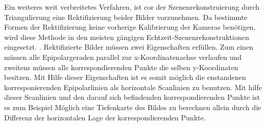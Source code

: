 %
%
%
%
%
%
%
%
Ein weiteres weit verbreitetes Verfahren, ist cor der Szenenrekonstruierung durch Triangulierung eine Rektifizierung beider Bilder vorzunehmen\cite{MatlabRec,ZZ,Javier,Fusiello}. Da bestimmte Formen der Rektifizierung keine vorherige Kalibrierung der Kameras benötigen, wird diese Methode in den meisten gängigen Echtzeit-Szenenrekonstruktionen eingesetzt. \cite{Fusiello,Javier,R.H.}.
Rektifizierte Bilder müssen zwei Eigenschaften erfüllen. Zum einen müssen alle Epipolargeraden parallel zur x-Koordinatenachse verlaufen und zweitens müssen alle korrespondierenden Punkte die selben y-Koordinaten besitzen\cite{ZZ}. Mit Hilfe dieser Eigenschaften ist es somit möglich die enstandenen korresponierenden Epipolarlinien als horizontale Scanlinien zu benutzen\cite{Javier,ZZ}. Mit hilfe dieser Scanlinien und den darauf sich befindenden korrespondierenden Punkte ist es zum Beispiel Möglich eine Tiefenkarte des Bildes zu berechnen allein durch die Differenz der horizontalen Lage der korrespondierenden Punkte\cite{Javier,ZZ}. \\
 
